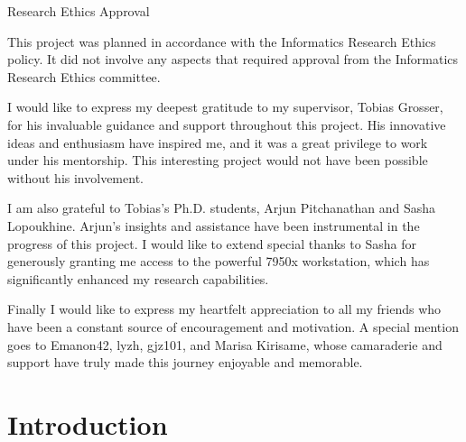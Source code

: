 \documentclass[logo,bsc,singlespacing,parskip]{infthesis}
\begin{document}
\begin{preliminary}
{%

}

\maketitle

\newenvironment{ethics}
   {\begin{frontenv}{Research Ethics Approval}{\LARGE}}
   {\end{frontenv}\newpage}

\begin{ethics}

This project was planned in accordance with the Informatics Research
Ethics policy. It did not involve any aspects that required approval
from the Informatics Research Ethics committee.

\standarddeclaration
\end{ethics}


\begin{acknowledgements}
    I would like to express my deepest gratitude to my supervisor, Tobias
    Grosser, for his invaluable guidance and support throughout this project.
    His innovative ideas and enthusiasm have inspired me, and it was a great
    privilege to work under his mentorship. This interesting project would not
    have been possible without his involvement.

    I am also grateful to Tobias's Ph.D. students, Arjun Pitchanathan
    and Sasha Lopoukhine. Arjun's insights and assistance have been instrumental
    in the progress of this project. I would like to extend special thanks to
    Sasha for generously granting me access to the powerful 7950x workstation,
    which has significantly enhanced my research capabilities.
    
    Finally I would like to express my heartfelt appreciation to all my friends who have
    been a constant source of encouragement and motivation. A special mention
    goes to Emanon42, lyzh, gjz101, and Marisa Kirisame, whose camaraderie and
    support have truly made this journey enjoyable and memorable.

\end{acknowledgements}


\tableofcontents
\end{preliminary}


\chapter{Introduction}
\label{sec:introduction}
\end{document}
